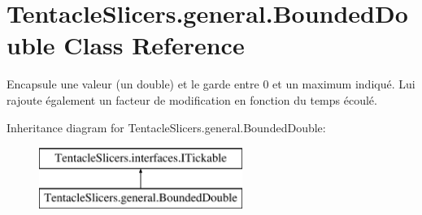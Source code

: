 \hypertarget{class_tentacle_slicers_1_1general_1_1_bounded_double}{}\section{Tentacle\+Slicers.\+general.\+Bounded\+Double Class Reference}
\label{class_tentacle_slicers_1_1general_1_1_bounded_double}


Encapsule une valeur (un double) et le garde entre 0 et un maximum indiqué. Lui rajoute également un facteur de modification en fonction du temps écoulé.  


Inheritance diagram for Tentacle\+Slicers.\+general.\+Bounded\+Double\+:\begin{figure}[H]
\begin{center}
\leavevmode
\includegraphics[height=2.000000cm]{class_tentacle_slicers_1_1general_1_1_bounded_double}
\end{center}
\end{figure}
